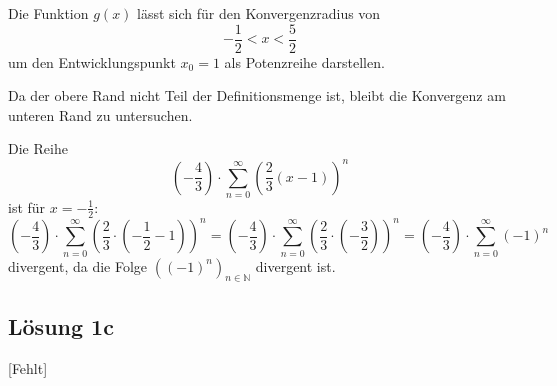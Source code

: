 Die Funktion $\displaystyle g( x)$ lässt sich für den Konvergenzradius von
\begin{equation*}
	-\frac{1}{2} < x< \frac{5}{2}
\end{equation*}
um den Entwicklungspunkt $\displaystyle x_{0} =1$ als Potenzreihe darstellen.

Da der obere Rand nicht Teil der Definitionsmenge ist, bleibt die Konvergenz am unteren Rand zu untersuchen. 

Die Reihe
\begin{equation*}
	\left( -\frac{4}{3}\right) \cdotp \sum _{n=0}^{\infty }\left(\frac{2}{3}( x-1)\right)^{n}
\end{equation*}
ist für $\displaystyle x=-\frac{1}{2}$:
\begin{equation*}
	\left( -\frac{4}{3}\right) \cdotp \sum _{n=0}^{\infty }\left(\frac{2}{3} \cdotp \left( -\frac{1}{2} -1\right)\right)^{n} =\left( -\frac{4}{3}\right) \cdotp \sum _{n=0}^{\infty }\left(\frac{2}{3} \cdotp \left( -\frac{3}{2}\right)\right)^{n} =\left( -\frac{4}{3}\right) \cdotp \sum _{n=0}^{\infty }( -1)^{n}
\end{equation*}
divergent, da die Folge $\displaystyle \left(( -1)^{n}\right)_{n\in \mathbb{N}}$ divergent ist.\\

\subsection{Lösung 1c}
[Fehlt]